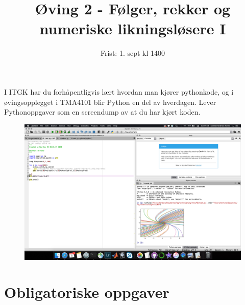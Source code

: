 \documentclass[a4paper,norsk,11pt]{interaktiv}
\title{Øving 2 - Følger, rekker og numeriske likningsløsere I}
\author{Frist: 1. sept kl 1400}
\begin{document}

\maketitle

I ITGK har du forhåpentligvis lært hvordan man kjører pythonkode, 
og i øvingsopplegget i TMA4101 blir Python en del av hverdagen. 
Lever Pythonoppgaver som en screendump av at du har kjørt koden.

\begin{figure}[htbp]
  \begin{center}
	\includegraphics[scale=.27]{screendump.png}
	\label{fig:Num1}
	\end{center}
\end{figure}


\section*{Obligatoriske oppgaver}
\end{document}
